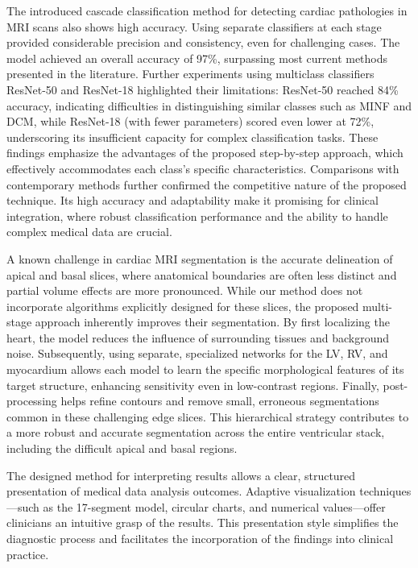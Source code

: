 \documentclass[fleqn,10pt]{wlscirep}
\begin{document}
The introduced cascade classification method for detecting cardiac pathologies in MRI scans also shows high accuracy. Using separate classifiers at each stage provided considerable precision and consistency, even for challenging cases. The model achieved an overall accuracy of 97\%, surpassing most current methods presented in the literature. Further experiments using multiclass classifiers ResNet-50 and ResNet-18 highlighted their limitations: ResNet-50 reached 84\% accuracy, indicating difficulties in distinguishing similar classes such as MINF and DCM, while ResNet-18 (with fewer parameters) scored even lower at 72\%, underscoring its insufficient capacity for complex classification tasks. These findings emphasize the advantages of the proposed step-by-step approach, which effectively accommodates each class’s specific characteristics. Comparisons with contemporary methods further confirmed the competitive nature of the proposed technique. Its high accuracy and adaptability make it promising for clinical integration, where robust classification performance and the ability to handle complex medical data are crucial.

A known challenge in cardiac MRI segmentation is the accurate delineation of apical and basal slices, where anatomical boundaries are often less distinct and partial volume effects are more pronounced. While our method does not incorporate algorithms explicitly designed for these slices, the proposed multi-stage approach inherently improves their segmentation. By first localizing the heart, the model reduces the influence of surrounding tissues and background noise. Subsequently, using separate, specialized networks for the LV, RV, and myocardium allows each model to learn the specific morphological features of its target structure, enhancing sensitivity even in low-contrast regions. Finally, post-processing helps refine contours and remove small, erroneous segmentations common in these challenging edge slices. This hierarchical strategy contributes to a more robust and accurate segmentation across the entire ventricular stack, including the difficult apical and basal regions.

The designed method for interpreting results allows a clear, structured presentation of medical data analysis outcomes. Adaptive visualization techniques—such as the 17-segment model, circular charts, and numerical values—offer clinicians an intuitive grasp of the results. This presentation style simplifies the diagnostic process and facilitates the incorporation of the findings into clinical practice.
\end{document}
